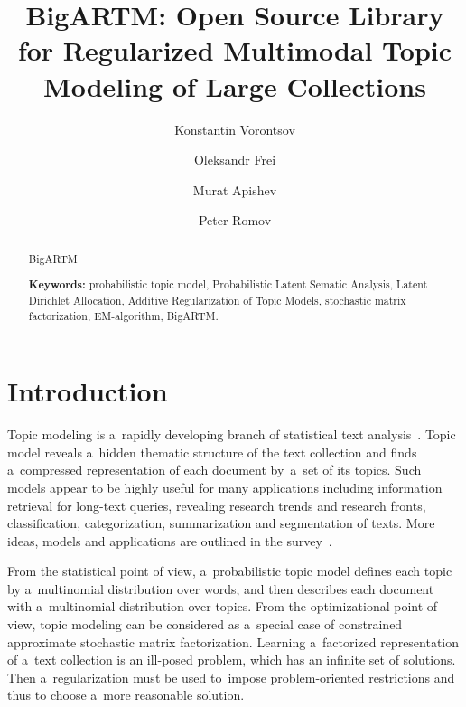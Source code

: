 \documentclass{llncs}
\begin{document}
\title{
    BigARTM: Open Source Library for
    Regularized Multimodal %
    Topic Modeling of Large Collections
}
\author{
    Konstantin Vorontsov
    \and
    Oleksandr Frei
    \and
    Murat Apishev
    \and
    Peter Romov
}

\maketitle

\begin{abstract}
    BigARTM

\vspace{1em}
\textbf{Keywords:}
    probabilistic topic model,
    Probabilistic Latent Sematic Analysis,
    Latent Dirichlet Allocation,
    Additive Regularization of Topic Models,
    stochastic matrix factorization,
    EM-algorithm,
    BigARTM.
\end{abstract}

\section{Introduction}

Topic modeling is a~rapidly developing branch of statistical text analysis~\cite{blei12ptm}.
Topic model reveals a~hidden thematic structure of the text collection
and finds a~compressed representation of each document by~a~set of its topics.
Such models appear to be highly useful for many applications including
information retrieval for long-text queries, 
revealing research trends and research fronts,
classification, categorization, summarization and segmentation of texts.
More ideas, models and applications are outlined in the survey~\cite{daud10knowledge}.

From the statistical point of view, a~probabilistic topic model
defines each topic by a~multinomial distribution over words,
and then describes each document with a~multinomial distribution over topics.
From the optimizational point of view, 
topic modeling can be considered as a~special case 
of constrained approximate stochastic matrix factorization.  
Learning a~factorized representation of a~text collection
is an ill-posed problem, which has an infinite set of solutions.
Then a~regularization must be used 
to~impose problem-oriented restrictions 
and thus to choose a~more reasonable solution.
\end{document}
